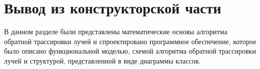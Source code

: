 
\section*{Вывод из конструкторской части}
В данном разделе были представлены математические основы алгоритма обратной трассировки лучей и спроектировано программное обеспечение, которое было описано функциональной моделью, схемой алгоритма обратной трассировки лучей и структурой, представленной в виде диаграммы классов.

\clearpage
